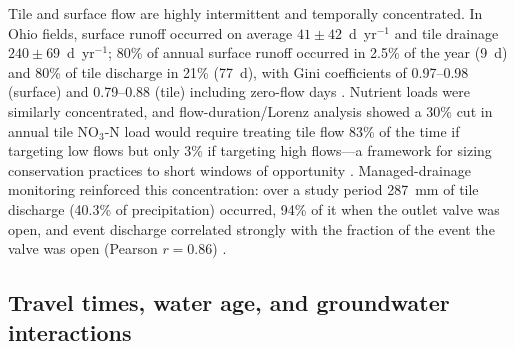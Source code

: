 \documentclass[11pt]{article}
\begin{document}
Tile and surface flow are highly intermittent and temporally concentrated. In Ohio fields, surface runoff occurred on average $41\pm42$~d~yr$^{-1}$ and tile drainage $240\pm69$~d~yr$^{-1}$; 80\% of annual surface runoff occurred in 2.5\% of the year (9~d) and 80\% of tile discharge in 21\% (77~d), with Gini coefficients of 0.97--0.98 (surface) and 0.79--0.88 (tile) including zero-flow days \parencite{Williams2018}. Nutrient loads were similarly concentrated, and flow-duration/Lorenz analysis showed a 30\% cut in annual tile NO$_3$-N load would require treating tile flow 83\% of the time if targeting low flows but only 3\% if targeting high flows---a framework for sizing conservation practices to short windows of opportunity \parencite{Williams2018}. Managed-drainage monitoring reinforced this concentration: over a study period 287~mm of tile discharge (40.3\% of precipitation) occurred, 94\% of it when the outlet valve was open, and event discharge correlated strongly with the fraction of the event the valve was open (Pearson $r=0.86$) \parencite{Miller2022}.

\subsection{Travel times, water age, and groundwater interactions}
\end{document}
